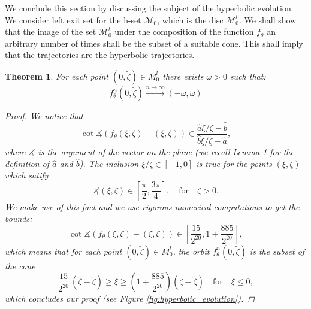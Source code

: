 \documentclass[1p]{article}
\newtheorem{theorem}{Theorem}
\begin{document}
We conclude this section by discussing the subject of the hyperbolic evolution. We consider left exit set for the h-set $\mathcal{M}_0$, which is the disc $\mathcal{M}_0^l$. We shall show that the image of the set $\mathcal{M}_0^l$ under the composition of the function $f_\theta$ an arbitrary number of times shall be the subset of a suitable cone. This shall imply that the trajectories are the hyperbolic trajectories.

\begin{theorem}
    \label{lem:hyperbolic_evolution}
    For each point $\left( 0,\tilde{\zeta} \right) \in M_0^l$ there exists $\omega > 0$ such that:
    \[
        f_\theta^n \left( 0,\tilde{\zeta} \right) \xrightarrow{n \to \infty} (-\omega,\omega)
    \]
    \begin{proof}
        We notice that
        \[
            \cot \measuredangle \left( f_\theta (\xi,\zeta) - (\xi,\zeta) \right) \in \frac{\hat{a} \xi/\zeta - \hat{b}}{\hat{b} \xi/\zeta - \hat{a}},
        \]
        where $\measuredangle$ is the argument of the vector on the plane (we recall Lemma \ref{lem:hyperbolic_evolution} for the definition of $\hat{a}$ and $\hat{b}$). The inclusion $\xi/\zeta \in [-1,0]$ is true for the points $(\xi,\zeta)$ which satify
        \[
            \measuredangle(\xi,\zeta) \in \left[ \frac{\pi}{2}, \frac{3\pi}{4} \right], \quad\text{for}\quad \zeta > 0.
        \]
        We make use of this fact and we use rigorous numerical computations to get the bounds:
        \[
            \cot \measuredangle \left( f_\theta (\xi,\zeta) - (\xi,\zeta) \right) \in \left[ \frac{15}{2^{20}}, 1 +\frac{885}{2^{20}} \right],
        \]
        which means that for each point $\left( 0,\tilde{\zeta} \right) \in M_0^l$, the orbit $f_\theta^n \left( 0,\tilde{\zeta} \right)$ is the subset of the cone
        \[
            \frac{15}{2^{20}} \, \left(\zeta - \tilde{\zeta}\right) \geq \xi \geq \left( 1 +\frac{885}{2^{20}} \right) \left(\zeta - \tilde{\zeta}\right) \quad\text{for}\quad \xi \leq 0,
        \]
        which concludes our proof (see Figure \ref{fig:hyperbolic_evolution}).
    \end{proof}
\end{theorem}
\end{document}
